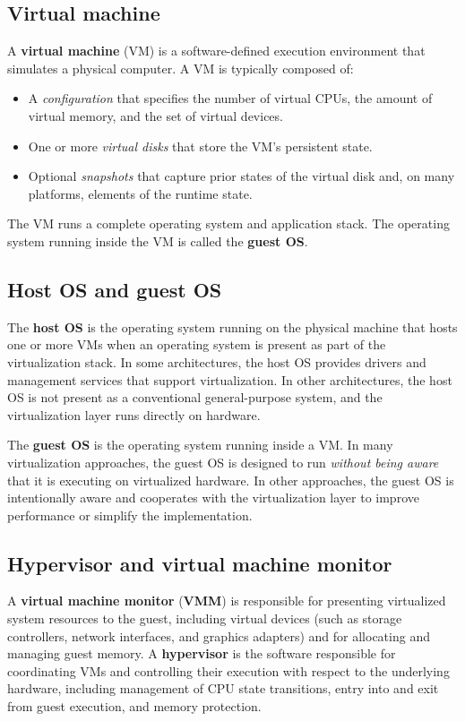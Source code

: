 \documentclass[11pt,a4paper,openany]{report}
\begin{document}
\subsection{Virtual machine}

A \textbf{virtual machine} (VM) is a software-defined execution environment that simulates a physical computer. A VM is typically composed of:

\begin{itemize}
\item A \emph{configuration} that specifies the number of virtual CPUs, the amount of virtual memory, and the set of virtual devices.
\item One or more \emph{virtual disks} that store the VM's persistent state.
\item Optional \emph{snapshots} that capture prior states of the virtual disk and, on many platforms, elements of the runtime state.
\end{itemize}

The VM runs a complete operating system and application stack. The operating system running inside the VM is called the \textbf{guest OS}.

\subsection{Host OS and guest OS}

The \textbf{host OS} is the operating system running on the physical machine that hosts one or more VMs when an operating system is present as part of the virtualization stack. In some architectures, the host OS provides drivers and management services that support virtualization. In other architectures, the host OS is not present as a conventional general-purpose system, and the virtualization layer runs directly on hardware.

The \textbf{guest OS} is the operating system running inside a VM. In many virtualization approaches, the guest OS is designed to run \emph{without being aware} that it is executing on virtualized hardware. In other approaches, the guest OS is intentionally aware and cooperates with the virtualization layer to improve performance or simplify the implementation.

\subsection{Hypervisor and virtual machine monitor}

A \textbf{virtual machine monitor} (\textbf{VMM}) is responsible for presenting virtualized system resources to the guest, including virtual devices (such as storage controllers, network interfaces, and graphics adapters) and for allocating and managing guest memory. A \textbf{hypervisor} is the software responsible for coordinating VMs and controlling their execution with respect to the underlying hardware, including management of CPU state transitions, entry into and exit from guest execution, and memory protection.
\end{document}
